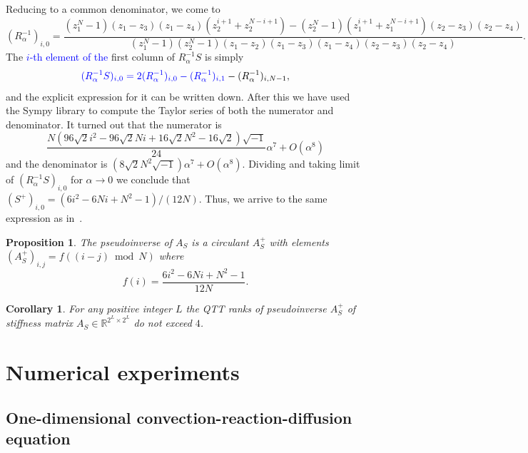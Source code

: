 \documentclass[a4paper]{article}
\newtheorem{corollary}{Corollary}[section]
\newtheorem{proposition}{Proposition}[section]
\newcommand{\LL}{L}
\newcommand{\lap}{A_S}
\newcommand{\base}{2}
\newcommand{\stiffnessQ}{R}
\begin{document}
    Reducing to a common denominator, we come to 
    \[
    (\stiffnessQ_\alpha^{-1})_{i,0}
    =
    \frac
    {\left(z_{1}^{N} - 1\right)\left(z_{1} - z_{3}\right) \left(z_{1} - z_{4}\right)  \left(z_{2}^{i + 1} + z_{2}^{N - i + 1}\right)
    -
    \left(z_{2}^{N} - 1\right)\left(z_{1}^{i + 1} + z_{1}^{N - i + 1}\right) \left(z_{2} - z_{3}\right) \left(z_{2} - z_{4}\right) }
    {\left(z_{1}^{N} - 1\right) \left(z_{2}^{N} - 1\right) \left(z_{1} - z_{2}\right) \left(z_{1} - z_{3}\right) \left(z_{1} - z_{4}\right) \left(z_{2} - z_{3}\right) \left(z_{2} - z_{4}\right) }.
    \]
    The \textcolor{blue}{$i$-th element of the} first column of $\stiffnessQ_\alpha^{-1}S$ is simply
    \[
    \textcolor{blue}{(\stiffnessQ_\alpha^{-1}S)_{i,0} = 2(\stiffnessQ_\alpha^{-1})_{i,0} - (\stiffnessQ_\alpha^{-1})_{i,1}} - (\stiffnessQ_\alpha^{-1})_{i,N-1},
    \]
    and the explicit expression for it can be written down.
    After this we have used the Sympy library to compute the Taylor series of both the numerator and denominator.
    It turned out that the numerator is 
    \[
    \frac{N \left(96 \sqrt{2} i^{2} - 96 \sqrt{2} N i + 16 \sqrt{2} N^{2}  - 16 \sqrt{2}\right)\sqrt{-1}}{24}\alpha^7 + O(\alpha^8)
    \]
    and the denominator is $(8\sqrt{2}N^2\sqrt{-1})\alpha^7 + O(\alpha^8)$.
    Dividing and taking limit of $(\stiffnessQ_\alpha^{-1}S)_{i,0}$ for $\alpha \to 0$ we conclude that
    $(S^+)_{i,0} = (6i^2 - 6Ni + N^2-1)/(12N)$. 
    Thus, we arrive to the same expression as in~\cite{plonka2016pseudo}.
% 
	\begin{proposition}
		The pseudoinverse of $\lap$ is a circulant $\lap^+$ with elements $(\lap^+)_{i,j} = f((i-j)\bmod N)$ where 
		\[
			f(i) = \frac{6i^2 - 6Ni + N^2-1}{12N}.
		\]
	\end{proposition}
	\begin{corollary}
	For any positive integer $\LL$ the QTT ranks of pseudoinverse $\lap^+$ of stiffness matrix $\lap \in \mathbb{R}^{\base^\LL \times \base^\LL}$ do not exceed $4$.
	\end{corollary}










\section{Numerical experiments} \label{sec:num_exp}

\subsection{One-dimensional convection-reaction-diffusion equation}
\end{document}
